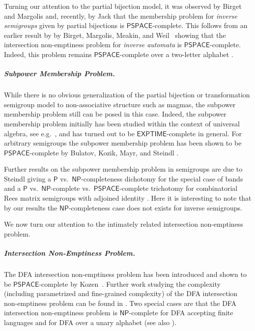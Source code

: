 \documentclass[anonymous,letter,UKenglish,cleveref,autoref,thm-restate]{lipics-v2021}
\newcommand{\eg}{e.g.~}
\newcommand{\Ptime}{\ensuremath{\mathsf{P}}\xspace}
\newcommand{\NP}{\ensuremath{\mathsf{NP}}\xspace}
\newcommand{\PSPACE}{\ensuremath{\mathsf{PSPACE}}\xspace}
\theoremstyle{plain}
\theoremstyle{plain}
\newcommand{\mysubparagraph}[1]{\vspace*{-2mm}\subparagraph*{#1}}
\begin{document}
Turning our attention to the partial bijection model, it was observed by Birget and Margolis \cite{BirgetM08} and, recently, by Jack \cite{Jack23} that the membership problem for \emph{inverse semigroups} given by partial bijections is \PSPACE-complete.
This follows from an earlier result by by Birget, Margolis, Meakin, and Weil~\cite{BirgetMMW94} showing that the intersection non-emptiness problem for \emph{inverse automata} is \PSPACE-complete.
Indeed, this problem remains \PSPACE-complete over a two-letter alphabet \cite{BirgetM08}.



\mysubparagraph{Subpower Membership Problem.}
While there is no obvious generalization of the partial bijection or transformation semigroup model to non-associative structure such as magmas, the subpower membership problem still can be posed in this case.
Indeed, the subpower membership problem initially has been studied within the context of universal algebra, see \eg \cite{Mayr12,BulatovMS19,Kompatscher24}, and has turned out to be $\mathsf{EXPTIME}$-complete \cite{Kozik08} in general.
For arbitrary semi\-groups the subpower membership problem has been shown to be $\PSPACE$-complete by Bulatov, Kozik, Mayr, and Steindl \cite{BulatovKMS16}.

Further results on the subpower membership problem in semigroups are due to Steindl giving a \Ptime vs.\ \NP-completeness dichotomy for the special case of bands \cite{Steindl17} and a \Ptime vs.\ \NP-complete vs.\ \PSPACE-complete trichotomy for combinatorial Rees matrix semigroups with adjoined identity
\cite{Steindl19}. 
Here it is interesting to note that by our results the \NP-completeness case does not exists for inverse semigroups.

\medbreak

We now turn our attention to the intimately related intersection non-emptiness problem.

\mysubparagraph{Intersection Non-Emptiness Problem.}
The DFA intersection non-emptiness problem has been introduced and shown to be $\PSPACE$-complete by Kozen~\cite{koz77}.
Further work studying the complexity (including parametrized and fine-grained complexity) of the DFA intersection non-emptiness problem can be found in \cite{FernauHW21,KarakostasLV03,LangeR92,HolzerK11,SwernofskyW15,Wehar14,OliveiraW20,ArrighiFHHJOW21}.
Two special cases are that the DFA intersection non-emptiness problem is \NP-complete for DFA accepting finite languages \cite{RampersadS10} and for DFA over a unary alphabet \cite{StockmeyerM73} (see also \cite{FernauK17}).
\end{document}
